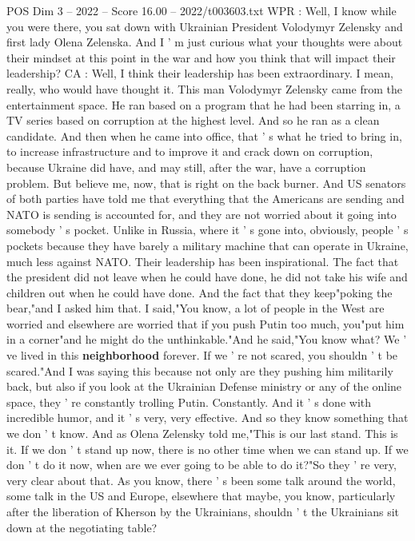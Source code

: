 \begin{textsample}{POS Dim 3 – 2022 – Score 16.00 – 2022/t003603.txt}
WPR : Well, I know while you were there, you sat down with Ukrainian President Volodymyr Zelensky and first lady Olena Zelenska.
And I ' m just curious what your thoughts were about their mindset at this point in the war and how you think that will impact their leadership?
CA : Well, I think their leadership has been extraordinary.
I mean, really, who would have thought it.
This man Volodymyr Zelensky came from the entertainment space.
He ran based on a program that he had been starring in, a TV series based on corruption at the highest level.
And so he ran as a clean candidate.
And then when he came into office, that ' s what he tried to bring in, to increase infrastructure and to improve it and crack down on corruption, because Ukraine did have, and may still, after the war, have a corruption problem.
But believe me, now, that is right on the back burner.
And US senators of both parties have told me that everything that the Americans are sending and NATO is sending is accounted for, and they are not worried about it going into somebody ' s pocket.
Unlike in Russia, where it ' s gone into, obviously, people ' s pockets because they have barely a military machine that can operate in Ukraine, much less against NATO.
Their leadership has been inspirational.
The fact that the president did not leave when he could have done, he did not take his wife and children out when he could have done.
And the fact that they keep"poking the bear,"and I asked him that.
I said,"You know, a lot of people in the West are worried and elsewhere are worried that if you push Putin too much, you"put him in a corner"and he might do the unthinkable."And he said,"You know what?
We ' ve lived in this \textbf{neighborhood} forever.
If we ' re not scared, you shouldn ' t be scared."And I was saying this because not only are they pushing him militarily back, but also if you look at the Ukrainian Defense ministry or any of the online space, they ' re constantly trolling Putin.
Constantly.
And it ' s done with incredible humor, and it ' s very, very effective.
And so they know something that we don ' t know.
And as Olena Zelensky told me,"This is our last stand.
This is it.
If we don ' t stand up now, there is no other time when we can stand up.
If we don ' t do it now, when are we ever going to be able to do it?"So they ' re very, very clear about that.
As you know, there ' s been some talk around the world, some talk in the US and Europe, elsewhere that maybe, you know, particularly after the liberation of Kherson by the Ukrainians, shouldn ' t the Ukrainians sit down at the negotiating table?

\end{textsample}
